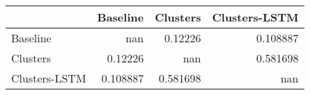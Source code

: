 \begin{tabular}{lrrr}
\toprule
               &   Baseline &   Clusters &   Clusters-LSTM \\
\midrule
 Baseline      & nan        &   0.12226  &        0.108887 \\
 Clusters      &   0.12226  & nan        &        0.581698 \\
 Clusters-LSTM &   0.108887 &   0.581698 &      nan        \\
\bottomrule
\end{tabular}